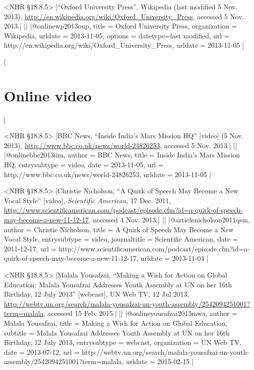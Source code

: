 \documentclass[extrafontsizes,11pt,a4paper,oneside]{memoir}
\begin{document}
\bibexample<NHR \S18.8.5>
|\enquote{Oxford University Press}, Wikipedia (last modified 5 Nov. 2013), \url{http://en.wikipedia.org/wiki/Oxford_University_Press}, accessed 5 Nov. 2013.|%
||%
|@online{wp2013oup,
  title = {Oxford University Press},
  organization = {Wikipedia},
  urldate = {2013-11-05},
  options = {datetype={last modified}},
  url = {http://en.wikipedia.org/wiki/Oxford_University_Press},
  urldate = {2013-11-05}
}|

\todoc|
\section{Online video}
|

\bibexample<NHR \S18.8.5>
|BBC News, \enquote{Inside India's Mars Mission HQ} [video] (5 Nov. 2013), \url{http://www.bbc.co.uk/news/world-24826253}, accessed 5 Nov. 2013.|%
||%
|@online{bbc2013iim,
  author = {{BBC News}},
  title = {Inside India's Mars Mission HQ},
  entrysubtype = {video},
  date = {2013-11-05},
  url = {http://www.bbc.co.uk/news/world-24826253},
  urldate = {2013-11-05}
}|

\bibexample<NHR \S18.8.5>
|Christie Nicholson, \enquote{A Quirk of Speech May Become a New Vocal Style} [video], \emph{Scientific American}, 17 Dec. 2011, \url{http://www.scientificamerican.com/podcast/episode.cfm?id=a-quirk-of-speech-may-become-a-new-11-12-17}, accessed 4 Nov. 2013.|%
||
|@article{nicholson2011qsm,
  author = {Christie Nicholson},
  title = {A Quirk of Speech May Become a New Vocal Style},
  entrysubtype = {video},
  journaltitle = {Scientific American},
  date = {2011-12-17},
  url = {http://www.scientificamerican.com/podcast/episode.cfm?id=a-quirk-of-speech-may-become-a-new-11-12-17},
  urldate = {2013-11-04}
}|

\bibexample<NHR \S18.8.5>
|Malala Yousafzai, \enquote{Making a Wish for Action on Global Education: Malala Yousafzai Addresses Youth Assembly at UN on her 16th Birthday, 12 July 2013} [webcast], UN Web TV, 12 Jul 2013, \url{http://webtv.un.org/search/malala-yousafzai-un-youth-assembly/2542094251001?term=malala}, accessed 15 Feb. 2015.|%
||%
|@online{yousafzai2013mwa,
  author = {Malala Yousafzai},
  title = {Making a Wish for Action on Global Education},
  subtitle = {Malala Yousafzai Addresses Youth Assembly at UN on her 16th Birthday, 12 July 2013},
  entrysubtype = {webcast},
  organization = {UN Web TV},
  date = {2013-07-12},
  url = {http://webtv.un.org/search/malala-yousafzai-un-youth-assembly/2542094251001?term=malala},
  urldate = {2015-02-15}
}|
\end{document}
